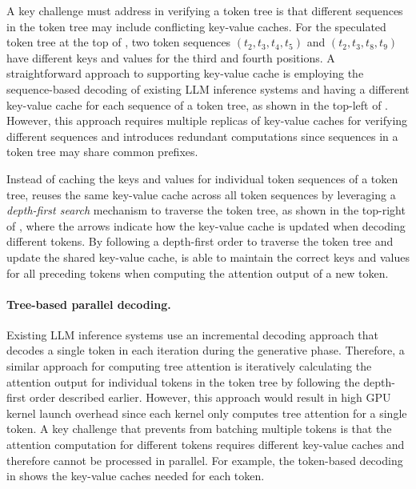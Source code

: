 A key challenge \Sys must address in verifying a token tree is that different sequences in the token tree may include conflicting key-value caches. For the speculated token tree at the top of , two token sequences $(t_2, t_3, t_4, t_5)$ and $(t_2, t_3, t_8, t_9)$ have different keys and values for the third and fourth positions.
A straightforward approach to supporting key-value cache is employing the sequence-based decoding of existing LLM inference systems and having a different key-value cache for each sequence of a token tree, as shown in the top-left of .
However, this approach requires multiple replicas of key-value caches for verifying different sequences and introduces redundant computations since sequences in a token tree may share common prefixes.

Instead of caching the keys and values for individual token sequences of a token tree, \Sys reuses the same key-value cache across all token sequences by leveraging a {\em depth-first search} mechanism to traverse the token tree, as shown in the top-right of , where the arrows indicate how the key-value cache is updated when decoding different tokens.
By following a depth-first order to traverse the token tree and update the shared key-value cache, \Sys is able to maintain the correct keys and values for all preceding tokens when computing the attention output of a new token. 

\paragraph{Tree-based parallel decoding.} Existing LLM inference systems use an incremental decoding approach that decodes a single token in each iteration during the generative phase. 
Therefore, a similar approach for computing tree attention is iteratively calculating the attention output for individual tokens in the token tree by following the depth-first order described earlier.
However, this approach would result in high GPU kernel launch overhead since each kernel only computes tree attention for a single token.
A key challenge that prevents \Sys from batching multiple tokens is that the attention computation for different tokens requires different key-value caches and therefore cannot be processed in parallel.
For example, the token-based decoding in  shows the key-value caches needed for each token.

